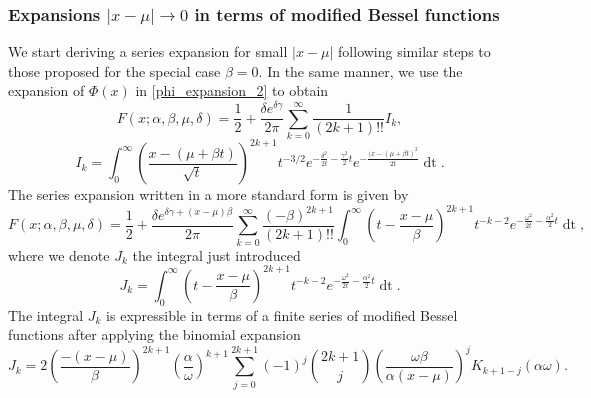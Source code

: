 \documentclass[10pt,a4paper,oneside]{article}
\numberwithin{equation}{section}
\begin{document}
\subsubsection{Expansions $|x-\mu| \to 0$ in terms of modified Bessel functions}
We start deriving a series expansion for small $|x-\mu|$ following similar steps to those proposed for the special case $\beta = 0$. In the same manner, we use the expansion of $\Phi(x)$ in  \eqref{phi_expansion_2} to obtain
\begin{equation}\label{general_series_xmu_zero_integral}
F(x;\alpha, \beta, \mu, \delta) = \frac{1}{2} + \frac{\delta e^{\delta \gamma}}{2\pi} \sum_{k=0}^{\infty} \frac{1}{(2k + 1)!!}I_k,
\end{equation}
\begin{equation}\label{general_xmu_zero_integral}
I_k = \int_0^{\infty} \left(\frac{x - (\mu +\beta t)}{\sqrt{t}}\right)^{2k+1} t^{-3/2} e^{-\frac{\delta^2}{2t} - \frac{\gamma^2}{2}t} e^{- \frac{(x-(\mu + \beta t)^2}{2t}} \mathop{dt}.
\end{equation}
The series expansion written in a more standard form is given by
\begin{equation}\label{general_series_xmu_zero_integral_2}
F(x;\alpha, \beta, \mu, \delta) = \frac{1}{2} + \frac{\delta e^{\delta \gamma + (x -\mu)\beta}}{2\pi}\sum_{k=0}^{\infty} \frac{(-\beta)^{2k+1}}{(2k + 1)!!}\int_0^{\infty} \left(t - \frac{x-\mu}{\beta}\right)^{2k+1} t^{-k-2} e^{-\frac{\omega^2}{2t} - \frac{\alpha^2}{2}t} \mathop{dt},
\end{equation}
where we denote $J_k$ the integral just introduced
\begin{equation}
J_k = \int_0^{\infty} \left(t - \frac{x-\mu}{\beta}\right)^{2k+1} t^{-k-2} e^{-\frac{\omega^2}{2t} - \frac{\alpha^2}{2}t} \mathop{dt}.
\end{equation}
The integral $J_k$ is expressible in terms of a finite series of modified Bessel functions after applying the binomial expansion
\begin{equation}
J_k = 2 \left(\frac{-(x-\mu)}{\beta}\right)^{2k+1} \left(\frac{\alpha}{\omega}\right)^{k+1} \sum_{j=0}^{2k+1} (-1)^j \binom{2k+1}{j} \left(\frac{\omega \beta}{\alpha (x-\mu)}\right)^j K_{k + 1 - j}(\alpha \omega).
\end{equation}
\end{document}
